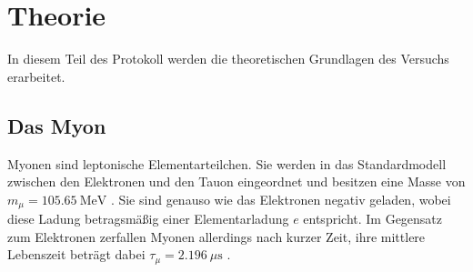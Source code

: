\section{Theorie}
\label{sec:theorie}
In diesem Teil des Protokoll werden die theoretischen Grundlagen des Versuchs erarbeitet.
\subsection{Das Myon}
Myonen sind leptonische Elementarteilchen.
Sie werden in das Standardmodell zwischen den Elektronen und den Tauon eingeordnet und besitzen eine Masse von $m_\mu = \SI{105.65}{\mega\eV}$ \cite{myonen}.
Sie sind genauso wie das Elektronen negativ geladen, wobei diese Ladung betragsmäßig einer Elementarladung $e$ entspricht.
Im Gegensatz zum Elektronen zerfallen Myonen allerdings nach kurzer Zeit, ihre mittlere Lebenszeit beträgt dabei $\tau_\mu = \SI{2.196}{\mu\second}$ \cite{myonen}.
